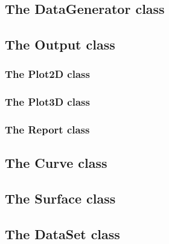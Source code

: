 
 \newpage
 \subsection[DataGenerator]{The DataGenerator class}
 


\subsection[Output]{The Output class}


\subsubsection[Plot2D]{The Plot2D class}


\subsubsection[Plot3D]{The Plot3D class}


\subsubsection[Report]{The Report class}


\subsection[Curve]{The Curve class}


\newpage
\subsection[Surface]{The Surface class}


\newpage
\subsection[DataSet]{The DataSet class}


